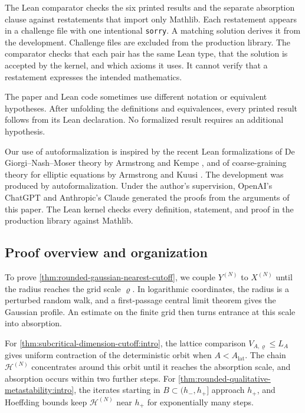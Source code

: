 \documentclass[11pt,reqno,a4paper]{article}
\begin{document}
The Lean comparator checks the six printed results and the separate absorption
clause against restatements that import only Mathlib. Each restatement appears
in a challenge file with one intentional \texttt{sorry}. A matching solution
derives it from the development. Challenge files are excluded from the
production library. The comparator checks that each pair has the same Lean
type, that the solution is accepted by the kernel, and which axioms it uses. It
cannot verify that a restatement expresses the intended mathematics.

The paper and Lean code sometimes use different notation or equivalent
hypotheses. After unfolding the definitions and equivalences, every printed
result follows from its Lean declaration. No formalized result requires an
additional hypothesis.

Our use of autoformalization is inspired by the recent Lean formalizations of
De Giorgi--Nash--Moser theory by Armstrong and Kempe
\cite{armstrong-kempe2026}, and of coarse-graining theory
for elliptic equations by Armstrong and Kuusi
\cite{armstrong-kuusi2026-coarsegraining}. The development was produced by
autoformalization. Under the author's supervision, OpenAI's ChatGPT and
Anthropic's Claude generated the proofs from the arguments of this paper. The
Lean kernel checks every definition, statement, and proof in the production
library against Mathlib.

\subsection{Proof overview and organization}
\label{subsec:proof-overview}

To prove \cref{thm:rounded-gaussian-nearest-cutoff}, we couple $Y^{(N)}$ to
$X^{(N)}$ until the radius reaches the grid scale $\varrho$. In logarithmic
coordinates, the radius is a perturbed random walk, and a first-passage central
limit theorem gives the Gaussian profile. An estimate on the finite grid then
turns entrance at this scale into absorption.

For \cref{thm:subcritical-dimension-cutoff:intro}, the lattice comparison
$V_{A,\varrho}\leq L_A$ gives uniform contraction of the deterministic orbit
when $A<A_{\mathrm{lat}}$. The chain $\mathscr H^{(N)}$ concentrates around this
orbit until it reaches the absorption scale, and absorption occurs within two
further steps.
For \cref{thm:rounded-qualitative-metastability:intro}, the iterates starting in
$B\subset(h_-,h_+]$ approach $h_+$, and Hoeffding bounds keep
$\mathscr H^{(N)}$ near $h_+$ for exponentially many steps.
\end{document}
